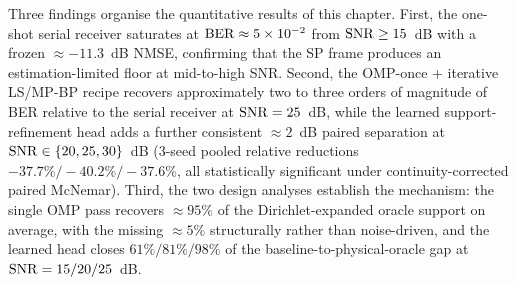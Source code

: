 Three findings organise the quantitative results of this chapter. First, the one-shot serial receiver saturates at $\mathrm{BER} \approx 5 \times 10^{-2}$ from $\mathrm{SNR} \geq 15$~dB with a frozen $\approx -11.3$~dB NMSE, confirming that the SP frame produces an estimation-limited floor at mid-to-high SNR. Second, the OMP-once + iterative LS/MP-BP recipe recovers approximately two to three orders of magnitude of BER relative to the serial receiver at $\mathrm{SNR} = 25$~dB, while the learned support-refinement head adds a further consistent $\approx 2$~dB paired separation at $\mathrm{SNR} \in \{20, 25, 30\}$~dB (3-seed pooled relative reductions $-37.7\%/-40.2\%/-37.6\%$, all statistically significant under continuity-corrected paired McNemar). Third, the two design analyses establish the mechanism: the single OMP pass recovers $\approx 95\%$ of the Dirichlet-expanded oracle support on average, with the missing $\approx 5\%$ structurally rather than noise-driven, and the learned head closes $61\%/81\%/98\%$ of the baseline-to-physical-oracle gap at $\mathrm{SNR} = 15/20/25$~dB.

